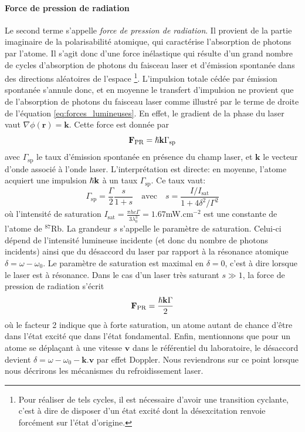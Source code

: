 \paragraph*{Force de pression de radiation}
Le second terme s'appelle \emph{force de pression de radiation}. Il provient de la partie imaginaire de la polarisabilité atomique, qui caractérise l'absorption de photons par l'atome. Il s'agit donc d'une force inélastique qui résulte d'un grand nombre de cycles d'absorption de photons du faisceau laser et d'émission spontanée dans des directions aléatoires de l'espace \footnote{Pour réaliser de tels cycles, il est nécessaire d'avoir une transition cyclante, c'est à dire de disposer d'un état excité dont la désexcitation renvoie forcément sur l'état d'origine.}. L'impulsion totale cédée par émission spontanée s'annule donc, et en moyenne le transfert d'impulsion ne provient que de l'absorption de photons du faisceau laser comme illustré par le terme de droite de l'équation \ref{eq:forces_lumineuses}. En effet, le gradient de la phase du laser vaut $\nabla \phi (\mathbf{r})=\mathbf{k}$. Cette force est donnée par
\begin{equation}
\mathbf{F}_{\mathrm{PR}}=\hslash \mathbf{k} \Gamma_{\mathrm{sp}} 
\end{equation}
avec $\Gamma_{\mathrm{sp}}$ le taux d'émission spontanée en présence du champ laser, et $\mathbf{k}$ le vecteur d'onde associé à l'onde laser. L'interprétation est directe: en moyenne, l'atome acquiert une impulsion $\hslash \mathbf{k}$ à un taux $\Gamma_{\mathrm{sp}}$. Ce taux vaut:
\begin{equation}
\Gamma_{\mathrm{sp}}=\frac{\Gamma}{2} \frac{s}{1+s} \quad \text{avec} \quad s=\frac{I/I_{\mathrm{sat}}}{1+4\delta^2/\Gamma^2}
\end{equation}
où l'intensité de saturation $I_{\mathrm{sat}}=\frac{\pi h c \Gamma}{3\lambda_0^3}=1.67$mW.cm${}^{-2}$ est une constante de l'atome de ${}^{87}$Rb. La grandeur $s$ s'appelle le paramètre de saturation. Celui-ci dépend de l'intensité lumineuse incidente (et donc du nombre de photons incidents) ainsi que du désaccord du laser par rapport à la résonance atomique $\delta = \omega-\omega_0$.  Le paramètre de saturation est maximal en $\delta=0$, c'est à dire lorsque le laser est à résonance. Dans le cas d'un laser très saturant $s \gg 1$, la force de pression de radiation s'écrit
\begin{equation}
\mathbf{F}_{\mathrm{PR}}=\frac{\hslash \mathbf{k} \Gamma}{2}
\end{equation}
où le facteur 2 indique que à forte saturation, un atome autant de chance d'être dans l'état excité que dans l'état fondamental. Enfin, mentionnons que pour un atome se déplaçant à une vitesse $\mathbf{v}$ dans le référentiel du laboratoire, le désaccord devient $\delta=\omega-\omega_0-\mathbf{k}.\mathbf{v}$ par effet Doppler. Nous reviendrons sur ce point lorsque nous décrirons les mécanismes du refroidissement laser.


